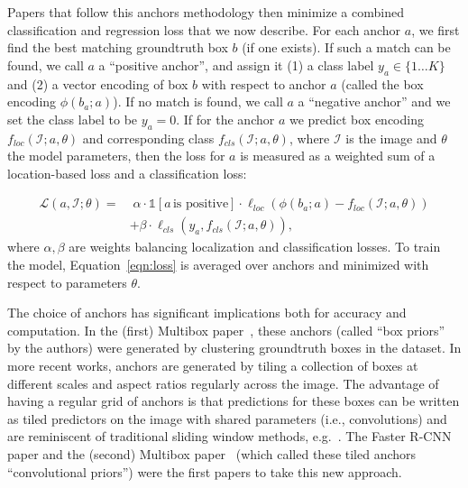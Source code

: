 \documentclass[10pt,twocolumn,letterpaper]{article}
\begin{document}
 Papers that follow this anchors methodology then minimize a combined classification and regression loss that we now describe.
For each anchor $a$, we first find the best matching groundtruth box $b$ (if one exists).  If such a match can be found, we call $a$ a ``positive anchor'',
and assign it (1) a class label $y_a \in {\{1 \dots K\}}$
and (2) a vector encoding of box $b$ with respect to anchor $a$
(called the box encoding $\phi(b_a; a)$).
If no match is found, we call $a$ a ``negative anchor'' and we set the 
class label to be $y_a=0$.
If for the anchor $a$ we predict box encoding $f_{loc}(\mathcal{I}; a, \theta)$  and corresponding class $f_{cls}(\mathcal{I}; a, \theta)$,
where $\mathcal{I}$ is the image and $\theta$ the model parameters,
then the loss for $a$ is measured as a weighted sum of a location-based loss and a classification loss:\vspace{-3mm}

{\footnotesize
\begin{align}
\mathcal{L}(a, \mathcal{I}; \theta) =&\; \alpha\cdot \mathds{1}[a \,\mbox{is positive}]\cdot \ell_{loc} (\phi(b_a; a) - f_{loc}(\mathcal{I}; a, \theta)) \nonumber \\
 & + \beta\cdot \ell_{cls} (y_a, f_{cls}(\mathcal{I}; a, \theta)),\label{eqn:loss}
\end{align}
}
where $\alpha,\beta$ are weights balancing localization and classification losses.  To train the model, Equation~\ref{eqn:loss} is averaged over anchors and minimized with respect to parameters $\theta$.


The choice of anchors has significant implications both for accuracy and computation.  In the (first) Multibox paper~\cite{erhan2014scalable}, these anchors (called ``box priors'' by the authors) were generated by clustering groundtruth boxes in the dataset.  In more recent works, anchors are generated by tiling a collection of boxes at different scales and aspect ratios regularly across the image.  The advantage of having a regular grid of anchors is that predictions for these boxes can be written as tiled predictors on the image with shared parameters (i.e., convolutions) and are reminiscent of traditional sliding window methods, e.g.~\cite{viola2004robust}.  The Faster R-CNN~\cite{ren2015faster} paper and the (second) Multibox paper~\cite{szegedy2014scalable} (which called these tiled anchors ``convolutional priors'') were the first papers to take this new approach.
\end{document}

